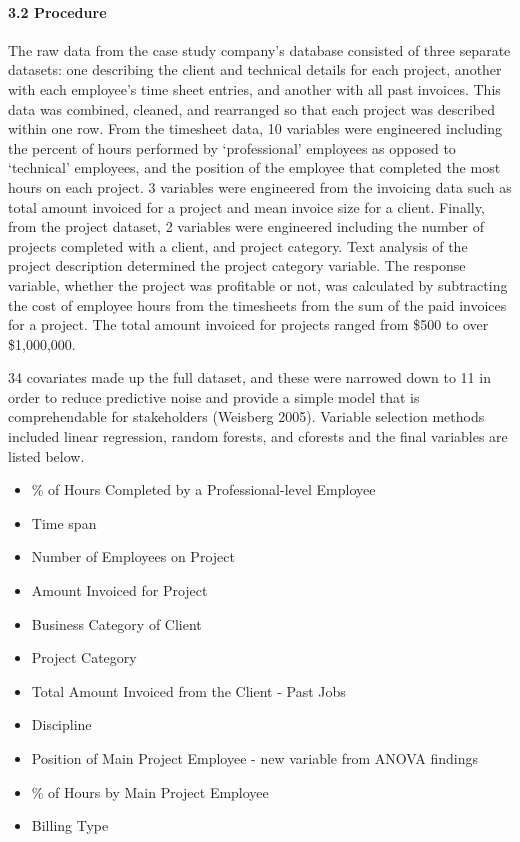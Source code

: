 \documentclass[]{elsarticle} %
\providecommand{\tightlist}{%
  \setlength{\itemsep}{0pt}\setlength{\parskip}{0pt}}
\begin{document}
\paragraph{3.2 Procedure}\label{procedure}

The raw data from the case study company's database consisted of three
separate datasets: one describing the client and technical details for
each project, another with each employee's time sheet entries, and
another with all past invoices. This data was combined, cleaned, and
rearranged so that each project was described within one row. From the
timesheet data, 10 variables were engineered including the percent of
hours performed by `professional' employees as opposed to `technical'
employees, and the position of the employee that completed the most
hours on each project. 3 variables were engineered from the invoicing
data such as total amount invoiced for a project and mean invoice size
for a client. Finally, from the project dataset, 2 variables were
engineered including the number of projects completed with a client, and
project category. Text analysis of the project description determined
the project category variable. The response variable, whether the
project was profitable or not, was calculated by subtracting the cost of
employee hours from the timesheets from the sum of the paid invoices for
a project. The total amount invoiced for projects ranged from \$500 to
over \$1,000,000.

34 covariates made up the full dataset, and these were narrowed down to
11 in order to reduce predictive noise and provide a simple model that
is comprehendable for stakeholders (Weisberg 2005). Variable selection
methods included linear regression, random forests, and cforests and the
final variables are listed below.

\begin{itemize}
\tightlist
\item
  \% of Hours Completed by a Professional-level Employee
\item
  Time span
\item
  Number of Employees on Project
\item
  Amount Invoiced for Project
\item
  Business Category of Client
\item
  Project Category
\item
  Total Amount Invoiced from the Client - Past Jobs
\item
  Discipline
\item
  Position of Main Project Employee - new variable from ANOVA findings
\item
  \% of Hours by Main Project Employee
\item
  Billing Type
\end{itemize}
\end{document}
